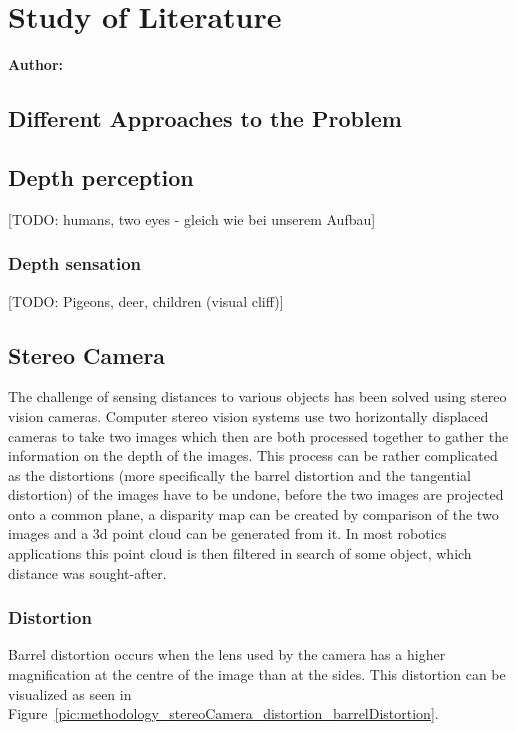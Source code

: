 \chapter{Study of Literature}

\textbf{Author: } 

\section{Different Approaches to the Problem}

\section{Depth perception}
[TODO: humans, two eyes - gleich wie bei unserem Aufbau]

\subsection{Depth sensation}
[TODO: Pigeons, deer, children (visual cliff)]

\section{Stereo Camera}
The challenge of sensing distances to various objects has been solved using stereo vision cameras. Computer stereo vision systems use two horizontally displaced cameras to take two images which then are both processed together to gather the information on the depth of the images. This process can be rather complicated as the distortions (more specifically the barrel distortion and the tangential distortion) of the images have to be undone, before the two images are projected onto a common plane, a disparity map can be created by comparison of the two images and a 3d point cloud can be generated from it. In most robotics applications this point cloud is then filtered in search of some object, which distance was sought-after.

\subsection{Distortion}
Barrel distortion occurs when the lens used by the camera has a higher magnification at the centre of the image than at the sides. This distortion can be visualized as seen in Figure~\ref{pic:methodology_stereoCamera_distortion_barrelDistortion}.

